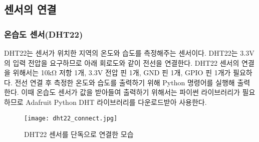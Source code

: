 \subsection{센서의 연결}

\begin{table}[]
	\caption{연구에서 사용한 센서의 목록}
	\label{SENSOR}
\end{table}

\subsubsection{온습도 센서(DHT22)}
DHT22는 센서가 위치한 지역의 온도와 습도를 측정해주는 센서이다. DHT22는 3.3V의 입력 전압을 요구하므로 아래 회로도와 같이 전선을 연결한다. DHT22 센서의 연결을 위해서는 10kΩ 저항 1개, 3.3V 전압 핀 1개, GND 핀 1개, GPIO 핀 1개가 필요하다. 전선 연결 후 측정한 온도와 습도를 출력하기 위해 Python 명령어를 실행해 출력한다. 이때 온습도 센서가 값을 받아들여 출력하기 위해서는 파이썬 라이브러리가 필요하므로 Adafruit Python DHT 라이브러리를 다운로드받아 사용한다.

\begin{figure}[htbp]
	\centering
	\texttt{[image: dht22\_connect.jpg]}
	\caption{DHT22 센서를 단독으로 연결한 모습}
	\label{DHT22}
\end{figure}

